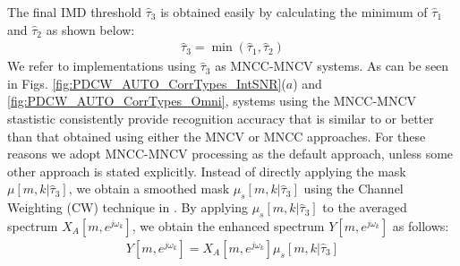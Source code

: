 \documentclass{article}
\begin{document}
The final IMD threshold  $\hat{\tau}_3$ is obtained easily by calculating the minimum of $\hat{\tau}_1$ and $\hat{\tau}_2$ as shown below:
\begin{align}
    \hat{\tau}_3 = \min(\hat{\tau}_1, \hat{\tau}_2) 
    \label{eq:tau3_eq}
\end{align}
We refer to implementations using $\hat{\tau}_3$   as  MNCC-MNCV systems.
As can be seen in Figs. \ref{fig:PDCW_AUTO_CorrTypes_IntSNR}($a$) and \ref{fig:PDCW_AUTO_CorrTypes_Omni}, systems using the MNCC-MNCV
stastistic consistently provide recognition accuracy that is similar to or better than that obtained using either the     MNCV or MNCC approaches.  For these reasons we adopt MNCC-MNCV processing as the default approach, unless some other approach is stated explicitly. 
Instead of directly applying the mask $\mu[m, k | \hat{\tau}_3]$, 
we obtain a smoothed mask $\mu_s[m, k| \hat{\tau}_3]$ using the Channel Weighting
(CW) technique in \cite{C_Kim_INTERSPEECH_2009_1}. By applying $\mu_s[m, k| \hat{\tau}_3]$ to the averaged spectrum $X_{A}[m, e^{j \omega_k}]$, we obtain the enhanced spectrum $Y[m, e^{j \omega_k}]$ as follows:
\begin{align}
        Y[m, e^{j \omega_k}]= X_{A}[m, e^{j \omega_k}] \mu_s[m, k| \hat{\tau}_3]
\end{align}
%
\end{document}

